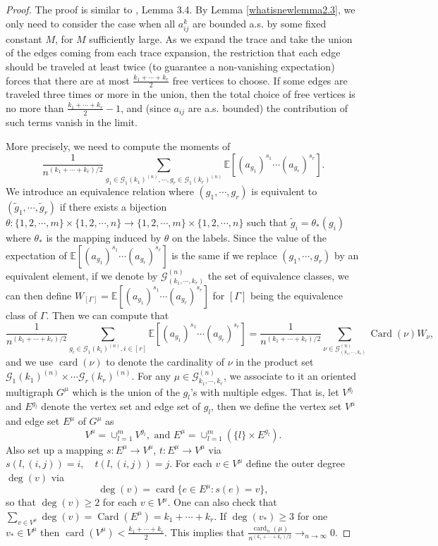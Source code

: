 \documentclass[12pt, reqno]{amsart}
\theoremstyle{definition}
\theoremstyle{remark}
\numberwithin{equation}{section}
\begin{document}
\begin{proof}
    The proof is similar to \cite{bordenave2021convergence}, Lemma 3.4. By Lemma \ref{whatisnewlemma2.3}, we only need to consider the case when all $a_{ij}^k$ are bounded a.s. by some fixed constant $M$, for $M$ sufficiently large.  As we expand the trace and take the union of the edges coming from each trace expansion, the restriction that each edge should be traveled at least twice (to guarantee a non-vanishing expectation) forces that there are at most $\frac{k_1+\cdots+k_r}{2}$ free vertices to choose. If some edges are traveled three times or more in the union, then the total choice of free vertices is no more than $\frac{k_1+\cdots+k_r}{2}-1$, and (since $a_{ij}$ are a.s. bounded) the contribution of such terms vanish in the limit. 

More precisely, we need to compute the moments of 
    $$
\frac{1}{n^{(k_1+\cdots+k_r)/2}} \sum_{g_1\in\mathcal{G}_1(k_1)^{(n)},\cdots,g_r\in\mathcal{G}_1(k_r)^{(n)}}\mathbb{E}[(a_{g_1})^{s_1}\cdots (a_{g_r})^{s_r}].
    $$
    We introduce an equivalence relation where $(g_1,\cdots,g_r)$ is equivalent to $(\tilde{g}_1,\cdots,\tilde{g}_r)$ if there exists a bijection $\theta:\{1,2,\cdots,m\}\times\{1,2,\cdots,n\}\to\{1,2,\cdots,m\}\times\{1,2,\cdots,n\}$ 
    such that $\tilde{g}_i=\theta_*(g_i)$ where $\theta_*$ is the mapping induced by $\theta$ on the labels. Since the value of the expectation of $\mathbb{E}[(a_{g_1})^{s_1}\cdots (a_{g_r})^{s_r}]$ is the same if we replace $(g_1,\cdots,g_r)$ by an equivalent element, if we denote by $\mathcal{G}^{(n)}_{(k_1,\cdots,k_r)}$ the set of equivalence classes, we can then define $W_{[\Gamma]}=\mathbb{E}[(a_{g_1})^{s_1}\cdots (a_{g_r})^{s_r}]$ for $[\Gamma]$ being the equivalence class of $\Gamma$. Then we can compute that 
    $$
\frac{1}{n^{(k_1+\cdots+k_r)/2}}\sum_{g_i\in\mathcal{G}_1(k_i)^{(n)},i\in[r]}\mathbb{E}[(a_{g_1})^{s_1}\cdots (a_{g_r})^{s_r}]=\frac{1}{n^{(k_1+\cdots+k_r)/2}}\sum_{\nu\in\mathcal{G}^{(n)}_{(k_1,\cdots,k_r)}}\operatorname{Card}(\nu)W_\nu,
    $$ and we use $\operatorname{card}(\nu)$ to denote the cardinality of $\nu$ in the product set $\mathcal{G}_1(k_1)^{(n)}\times\cdots\mathcal{G}_r(k_r)^{(n)}$. For any $\mu\in \mathcal{G}_{k_1,\cdots,k_r}^{(n)}$, we associate to it an oriented multigraph $G^\mu$ which is the union of the $g_l$'s with multiple edges. That is, let $V^{g_l}$ and $E^{g_l}$ denote the vertex set and edge set of $g_l$, then we define the vertex set $V^\mu$ and edge set $E^\mu$ of $G^\mu$ as 
    $$
V^\mu=\cup_{l=1}^m V^{g_l},\text{ and }E^\mu=\cup_{l=1}^m (\{l\}\times E^{g_l}). 
    $$Also set up a mapping $s:E^\mu\to V^\mu$, $t:E^\mu\to V^\mu$ via 
    $s(l,(i,j))=i,\quad t(l,(i,j))=j$. For each $v\in V^\mu$ define the outer degree $\deg(v)$ via $$\deg(v)=\operatorname{card}\{e\in E^\mu:s(e)=v\},$$ so that $\operatorname{deg}(v)\geq 2$ for each $v\in V^\mu$. One can also check that $\sum_{v\in V^\mu}\operatorname{deg}(v)=\operatorname{Card}(E^\mu)=k_1+\cdots+k_r$. If $\operatorname{deg}(v_*)\geq 3$ for one $v_*\in V^\mu$ then $\operatorname{card}(V^\mu)<\frac{k_1+\cdots+k_r}{2}.$
This implies that $\frac{\operatorname{card}_n(\mu)}{n^{(k_1+\cdots+k_r)/2}}\to_{n\to\infty}0$. 


\end{proof}
\end{document}
